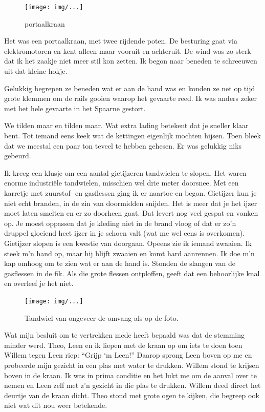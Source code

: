 \documentclass[12pt,twoside]{memoir}
\begin{document}
\begin{figure}[t]
\texttt{[image: img/...]}
\caption{portaalkraan}
\end{figure}

Het was een portaalkraan, met twee rijdende poten. De besturing gaat via elektromotoren en kent alleen maar vooruit en achteruit. De wind was zo sterk dat ik het zaakje niet meer stil kon zetten. Ik begon naar beneden te schreeuwen uit dat kleine hokje. 

Gelukkig begrepen ze beneden wat er aan de hand was en konden ze net op tijd grote klemmen om de rails gooien waarop het gevaarte reed. Ik was anders zeker met het hele gevaarte in het Spaarne gestort.

We tilden maar en tilden maar. Wat extra lading betekent dat je sneller klaar bent. Tot iemand eens keek wat de kettingen eigenlijk mochten hijsen. Toen bleek dat we meestal een paar ton teveel te hebben gehesen. Er was gelukkig niks gebeurd.

Ik kreeg een klusje om een aantal gietijzeren tandwielen te slopen. Het waren enorme industriële tandwielen, misschien wel drie meter doorsnee. Met een karretje met zuurstof- en gasflessen ging ik er naartoe en begon. Gietijzer kun je niet echt branden, in de zin van doormidden snijden. Het is meer dat je het ijzer moet laten smelten en er zo doorheen gaat. Dat levert nog veel gespat en vonken op. Je moest oppassen dat je kleding niet in de brand vloog of dat er zo’n druppel gloeiend heet ijzer in je schoen valt (wat me wel eens is overkomen). Gietijzer slopen is een kwestie van doorgaan. Opeens zie ik iemand zwaaien. Ik steek m’n hand op, maar hij blijft zwaaien en komt hard aanrennen. Ik doe m’n kap omhoog om te zien wat er aan de hand is. Stonden de slangen van de gasflessen in de fik. Als die grote flessen ontploffen, geeft dat een behoorlijke knal en overleef je het niet. 

\begin{figure}[t]
\texttt{[image: img/...]}
\caption{Tandwiel van ongeveer de omvang als op de foto.}
\end{figure}

Wat mijn besluit om te vertrekken mede heeft bepaald was dat de stemming minder werd. Theo, Leen en ik liepen met de kraan op om iets te doen toen Willem tegen Leen riep: ``Grijp ‘m Leen!'' Daarop sprong Leen boven op me en probeerde mijn gezicht in een plas met water te drukken. Willem stond te krijsen boven in de kraan. Ik was in prima conditie en het lukt me om de aanval  over te nemen en Leen zelf met z’n gezicht in die plas te drukken. Willem deed direct het deurtje van de kraan dicht. Theo stond met grote ogen te kijken, die begreep ook niet wat dit nou weer betekende.
\end{document}
